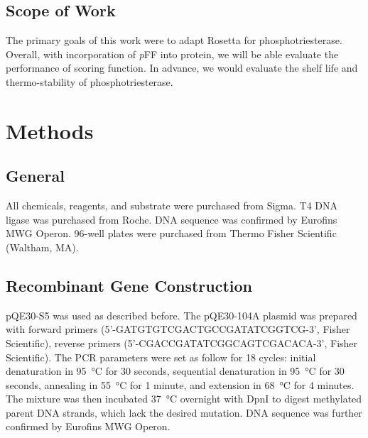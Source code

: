 \begin{refsection}
\subsection{Scope of Work}

The primary goals of this work were to adapt Rosetta for phosphotriesterase.
Overall, with incorporation of \emph{p}FF into protein, we will be able
evaluate the performance of scoring function. In advance, we would evaluate the
shelf life and thermo-stability of phosphotriesterase.

\section{Methods}

\subsection{General}

All chemicals, reagents, and substrate were purchased from Sigma. T4 DNA ligase
was purchased from Roche. DNA sequence was confirmed by Eurofins MWG Operon.
96-well plates were purchased from Thermo Fisher Scientific (Waltham, MA).

\subsection{Recombinant Gene Construction}

pQE30-S5 was used as described before.\cite{Baker2011b} The pQE30-104A plasmid
was prepared with forward primers (5’-GATGTGTCGACTGCCGATATCGGTCG-3’, Fisher
Scientific), reverse primers (5’-CGACCGATATCGGCAGTCGACACA-3’, Fisher
Scientific). The PCR parameters were set as follow for 18 cycles: initial
denaturation in \SI{95}{\celsius} for 30 seconds, sequential denaturation in
\SI{95}{\celsius} for 30 seconds, annealing in \SI{55}{\celsius} for 1 minute,
and extension in \SI{68}{\celsius} for 4 minutes. The mixture was then
incubated \SI{37}{\celsius} overnight with DpnI to digest methylated parent DNA
strands, which lack the desired mutation. DNA sequence was further confirmed by
Eurofins MWG Operon.


\end{refsection}
